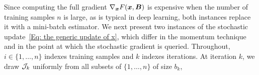Since computing the full gradient $\nabla_{\bm{x}} F(\bm{x},\bm{B})$ is expensive when the number of training samples $n$ is large, as is typical in deep learning, both instances replace it with a mini-batch estimator. We next present two instances of the stochastic update~\eqref{Eq: the generic update of x}, which differ in the momentum technique and in the point at which the stochastic gradient is queried. Throughout, $i\in\{1,\ldots,n\}$ indexes training samples and $k$ indexes iterations. At iteration $k$, we draw $\mathcal{J}_k$ uniformly from all subsets of $\{1,\ldots,n\}$ of size $b_k$, 
